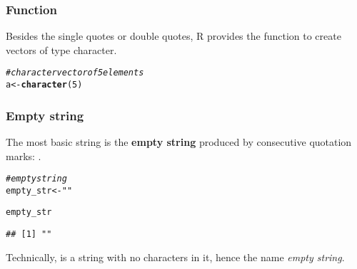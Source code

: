 \documentclass[12pt]{beamer}\usepackage[]{graphicx}\usepackage[]{color}
\makeatletter
\newcommand{\hlnum}[1]{\textcolor[rgb]{0.686,0.059,0.569}{#1}}%
\newcommand{\hlstr}[1]{\textcolor[rgb]{0.192,0.494,0.8}{#1}}%
\newcommand{\hlcom}[1]{\textcolor[rgb]{0.678,0.584,0.686}{\textit{#1}}}%
\newcommand{\hlstd}[1]{\textcolor[rgb]{0.345,0.345,0.345}{#1}}%
\newcommand{\hlkwb}[1]{\textcolor[rgb]{0.69,0.353,0.396}{#1}}%
\newcommand{\hlkwd}[1]{\textcolor[rgb]{0.737,0.353,0.396}{\textbf{#1}}}%
\newenvironment{kframe}{%
 \def\at@end@of@kframe{}%
 \ifinner\ifhmode%
  \def\at@end@of@kframe{\end{minipage}}%
  \begin{minipage}{\columnwidth}%
 \fi\fi%
 \def\FrameCommand##1{\hskip\@totalleftmargin \hskip-\fboxsep
 \colorbox{shadecolor}{##1}\hskip-\fboxsep
     \hskip-\linewidth \hskip-\@totalleftmargin \hskip\columnwidth}%
 \MakeFramed {\advance\hsize-\width
   \@totalleftmargin\z@ \linewidth\hsize
   \@setminipage}}%
 {\par\unskip\endMakeFramed%
 \at@end@of@kframe}
\newenvironment{knitrout}{}{} %
\makeatother
\begin{document}

\begin{frame}[fragile]
\frametitle{Function }

Besides the single quotes or double quotes, R provides the function  to create vectors of type character. 

\begin{knitrout}\footnotesize
{}\color{fgcolor}\begin{kframe}
\begin{alltt}
\hlcom{# character vector of 5 elements}
\hlstd{a} \hlkwb{<-} \hlkwd{character}\hlstd{(}\hlnum{5}\hlstd{)}
\end{alltt}
\end{kframe}
\end{knitrout}

\end{frame}


\begin{frame}[fragile]
\frametitle{Empty string}

The most basic string is the \textbf{empty string} produced by consecutive quotation marks: . 
\begin{knitrout}\footnotesize
{}\color{fgcolor}\begin{kframe}
\begin{alltt}
\hlcom{# empty string}
\hlstd{empty_str} \hlkwb{<-} \hlstr{""}

\hlstd{empty_str}
\end{alltt}
\begin{verbatim}
## [1] ""
\end{verbatim}
\end{kframe}
\end{knitrout}
Technically,  is a string with no characters in it, hence the name \textit{empty string}.

\end{frame}

\end{document}
